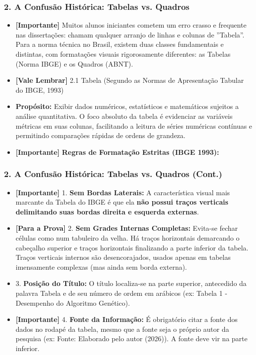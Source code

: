 \documentclass[10pt, aspectratio=169]{slidesiffmodelo}
\begin{document}
\begin{frame}[t]
    \frametitle{\color{iffgold}2. A Confusão Histórica: Tabelas vs. Quadros}
    \begin{itemize}
        \item \textcolor{iffgreen}{\textbf{[Importante]} Muitos alunos iniciantes cometem um erro crasso e frequente nas dissertações: chamam qualquer arranjo de linhas e colunas de ''Tabela''. Para a norma técnica no Brasil, existem duas classes fundamentais e distintas, com formatações visuais rigorosamente diferentes: as Tabelas (Norma IBGE) e os Quadros (ABNT).}
        \item \textcolor{iffblue}{\textbf{[Vale Lembrar]} 2.1 Tabela (Segundo as Normas de Apresentação Tabular do IBGE, 1993)}
        \item \textbf{Propósito:} Exibir dados numéricos, estatísticos e matemáticos sujeitos a análise quantitativa. O foco absoluto da tabela é evidenciar as variáveis métricas em suas colunas, facilitando a leitura de séries numéricas contínuas e permitindo comparações rápidas de ordens de grandeza.
        \item \textcolor{iffgreen}{\textbf{[Importante]} \textbf{Regras de Formatação Estritas (IBGE 1993):}}
    \end{itemize}
\end{frame}

\begin{frame}[t]
    \frametitle{\color{iffgold}2. A Confusão Histórica: Tabelas vs. Quadros (Cont.)}
    \begin{itemize}
        \item \textcolor{iffgreen}{\textbf{[Importante]} 1.  \textbf{Sem Bordas Laterais:} A característica visual mais marcante da Tabela do IBGE é que ela \textbf{não possui traços verticais delimitando suas bordas direita e esquerda externas}.}
        \item \textcolor{iffviolet}{\textbf{[Para a Prova]} 2.  \textbf{Sem Grades Internas Completas:} Evita-se fechar células como num tabuleiro da velha. Há traços horizontais demarcando o cabeçalho superior e traços horizontais finalizando a parte inferior da tabela. Traços verticais internos são desencorajados, usados apenas em tabelas imensamente complexas (mas ainda sem borda externa).}
        \item 3.  \textbf{Posição do Título:} O título localiza-se na parte superior, antecedido da palavra Tabela e de seu número de ordem em arábicos (ex: Tabela 1 - Desempenho do Algoritmo Genético).
        \item \textcolor{iffgreen}{\textbf{[Importante]} 4.  \textbf{Fonte da Informação:} É obrigatório citar a fonte dos dados no rodapé da tabela, mesmo que a fonte seja o próprio autor da pesquisa (ex: Fonte: Elaborado pelo autor (2026)). A fonte deve vir na parte inferior.}
    \end{itemize}
\end{frame}
\end{document}
